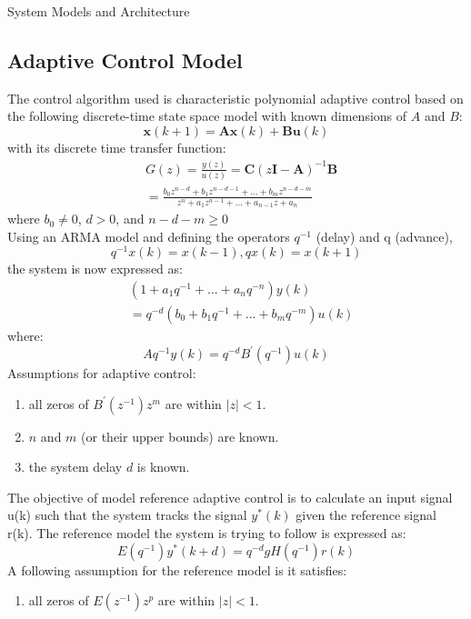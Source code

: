 \begin{section}{System Models and Architecture}
\subsection{Adaptive Control Model}
The control algorithm used is characteristic polynomial adaptive control based on the following discrete-time state space model with known dimensions of $A$ and $B$:
	\begin{equation}
	\bm{x}(k+1) = \bm{A}\bm{x}(k) + \bm{B}\bm{u}(k)
	\end{equation}
with its discrete time transfer function:
	\begin{align}
        & G(z) = \frac{y(z)}{u(z)} = \bm{C}(z\bm{I}-\bm{A})^{-1}\bm{B} \nonumber \\ 
	& = \frac{b_0z^{n-d}+b_1z^{n-d-1} +...+b_mz^{n-d-m}}{z^{n}+a_1z^{n-1}+...+a_{n-1}z+a_n}
	\end{align}
where $b_0\ne{0}$, $d>0$, and $n-d-m\geq{0}$\\
Using an ARMA model and defining the operators $q^{-1}$ (delay) and q (advance),
	\begin{equation}
	q^{-1}x(k) = x(k-1), qx(k) = x(k+1)
	\end{equation}
the system is now expressed as:
	\begin{align}
	& (1+a_1q^{-1}+...+a_nq^{-n})y(k) \nonumber \\
	& =q^{-d}(b_0+b_1q^{-1}+...+b_mq^{-m})u(k)
	\end{align}
where:
	\begin{equation}
	Aq^{-1}y(k)=q^{-d}B^{'}(q^{-1})u(k)
	\end{equation}
	Assumptions for adaptive control: 
	\begin{enumerate}
	\item all zeros of $B^{'}(z^{-1})z^m$ are within $|z|<1$. 
	\item $n$ and $m$ (or their upper bounds) are known. 
	\item the system delay $d$ is known.
	\end{enumerate}
The objective of model reference adaptive control is to calculate an input signal u(k) such that the system tracks the signal $y^{*}(k)$ given the reference signal r(k). The reference model the system is trying to follow is expressed as:
	\begin{equation}
	E(q^{-1})y^*(k+d)=q^{-d}gH(q^{-1})r(k)
	\end{equation}
A following assumption for the reference model is it satisfies:
    \begin{enumerate}
	\item all zeros of $E(z^{-1})z^p$ are within $|z|<1$. 

\end{enumerate}
\end{section}
